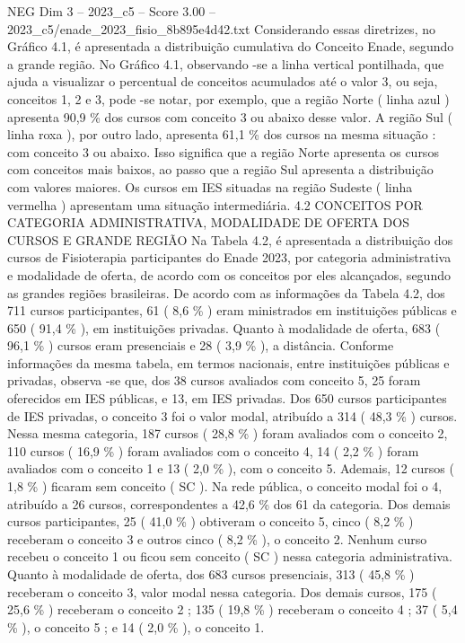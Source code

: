 \begin{textsample}{NEG Dim 3 – 2023\_c5 – Score 3.00 – 2023\_c5/enade\_2023\_fisio\_8b895e4d42.txt}
Considerando essas diretrizes, no Gráfico 4.1, é apresentada a distribuição cumulativa do Conceito Enade, segundo a grande região.
No Gráfico 4.1, observando -se a linha vertical pontilhada, que ajuda a visualizar o percentual de conceitos acumulados até o valor 3, ou seja, conceitos 1, 2 e 3, pode -se notar, por exemplo, que a região Norte ( linha azul ) apresenta 90,9 \% dos cursos com conceito 3 ou abaixo desse valor.
A região Sul ( linha roxa ), por outro lado, apresenta 61,1 \% dos cursos na mesma situação : com conceito 3 ou abaixo.
Isso significa que a região Norte apresenta os cursos com conceitos mais baixos, ao passo que a região Sul apresenta a distribuição com valores maiores.
Os cursos em IES situadas na região Sudeste ( linha vermelha ) apresentam uma situação intermediária. 4.2 CONCEITOS POR CATEGORIA ADMINISTRATIVA, MODALIDADE DE OFERTA DOS CURSOS E GRANDE REGIÃO Na Tabela 4.2, é apresentada a distribuição dos cursos de Fisioterapia participantes do Enade 2023, por categoria administrativa e modalidade de oferta, de acordo com os conceitos por eles alcançados, segundo as grandes regiões brasileiras.
De acordo com as informações da Tabela 4.2, dos 711 cursos participantes, 61 ( 8,6 \% ) eram ministrados em instituições públicas e 650 ( 91,4 \% ), em instituições privadas.
Quanto à modalidade de oferta, 683 ( 96,1 \% ) cursos eram presenciais e 28 ( 3,9 \% ), a distância.
Conforme informações da mesma tabela, em termos nacionais, entre instituições públicas e privadas, observa -se que, dos 38 cursos avaliados com conceito 5, 25 foram oferecidos em IES públicas, e 13, em IES privadas.
Dos 650 cursos participantes de IES privadas, o conceito 3 foi o valor modal, atribuído a 314 ( 48,3 \% ) cursos.
Nessa mesma categoria, 187 cursos ( 28,8 \% ) foram avaliados com o conceito 2, 110 cursos ( 16,9 \% ) foram avaliados com o conceito 4, 14 ( 2,2 \% ) foram avaliados com o conceito 1 e 13 ( 2,0 \% ), com o conceito 5.
Ademais, 12 cursos ( 1,8 \% ) ficaram sem conceito ( SC ).
Na rede pública, o conceito modal foi o 4, atribuído a 26 cursos, correspondentes a 42,6 \% dos 61 da categoria.
Dos demais cursos participantes, 25 ( 41,0 \% ) obtiveram o conceito 5, cinco ( 8,2 \% ) receberam o conceito 3 e outros cinco ( 8,2 \% ), o conceito 2.
Nenhum curso recebeu o conceito 1 ou ficou sem conceito ( SC ) nessa categoria administrativa.
Quanto à modalidade de oferta, dos 683 cursos presenciais, 313 ( 45,8 \% ) receberam o conceito 3, valor modal nessa categoria.
Dos demais cursos, 175 ( 25,6 \% ) receberam o conceito 2 ; 135 ( 19,8 \% ) receberam o conceito 4 ; 37 ( 5,4 \% ), o conceito 5 ; e 14 ( 2,0 \% ), o conceito 1.

\end{textsample}
